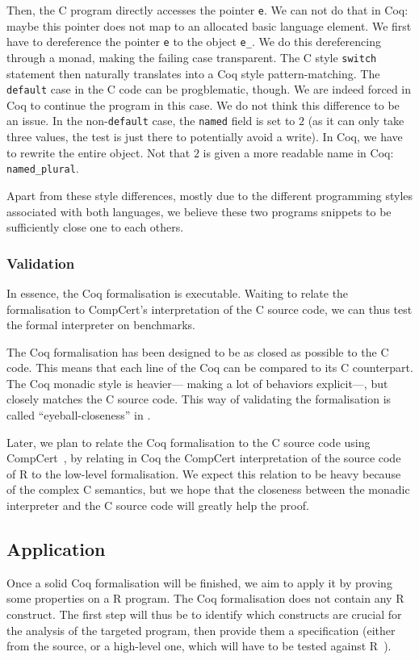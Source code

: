 \documentclass{article}
\newcommand\Coq{Coq}
\newcommand\R{R}
\newcommand\Cn{C}
\begin{document}
Then, the \Cn{} program directly accesses the pointer \texttt{e}.
We can not do that in \Coq{}:
maybe this pointer does not map to an allocated basic language element.
We first have to dereference the pointer \texttt{e}
to the object \texttt{e_}.
We do this dereferencing through a monad,
making the failing case transparent.
The \Cn{} style \texttt{switch} statement then naturally translates
into a \Coq{} style pattern-matching.
The \texttt{default} case in the \Cn{} code can be progblematic, though.
We are indeed forced in \Coq{} to continue the program in this case.
We do not think this difference to be an issue.
In the non-\texttt{default} case,
the \texttt{named} field is set to \(2\)
(as it can only take three values, the test is just there to potentially avoid a write).
In \Coq{}, we have to rewrite the entire object.
Not that \(2\) is given a more readable name in \Coq{}:
\texttt{named_plural}.

Apart from these style differences,
mostly due to the different programming styles associated with both languages,
we believe these two programs snippets to be sufficiently close one to each others.


\subsubsection{Validation}

In essence, the \Coq{} formalisation is executable.
Waiting to relate the formalisation to CompCert's interpretation
of the \Cn{} source code, we can thus test the formal interpreter
on benchmarks.

The \Coq{} formalisation has been designed to be as closed as
possible to the \Cn{} code.
This means that each line of the \Coq{} can be compared to its
\Cn{} counterpart.
The \Coq{} monadic style is heavier—%
making a lot of behaviors explicit—,
but closely matches the \Cn{} source code.
This way of validating the formalisation is called “eyeball-closeness”
in \cite{bodin2014trusted}.

Later, we plan to relate the \Coq{} formalisation
to the \Cn{} source code using CompCert~\parencite{Leroy-Compcert-CACM},
by relating in \Coq{} the CompCert interpretation of the source code of \R{}
to the low-level formalisation.
We expect this relation to be heavy because of the complex \Cn{} semantics,
but we hope that the closeness between the monadic interpreter and the \Cn{}
source code will greatly help the proof.


\subsection{Application}

Once a solid \Coq{} formalisation will be finished,
we aim to apply it by proving some properties on a \R{} program.
%
The \Coq{} formalisation does not contain any \R{} construct.
The first step will thus be to identify which constructs
are crucial for the analysis of the targeted program,
then provide them a specification
(either from the source, or a high-level one, which will have
to be tested against \R{}~\parencite{maj2013testr}).


\printbibliography
\end{document}
